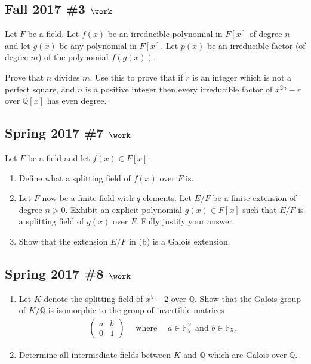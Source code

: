 \hypertarget{fall-2017-3-work}{%
\subsection{\texorpdfstring{Fall 2017 \#3
\(\work\)}{Fall 2017 \#3 \textbackslash work}}\label{fall-2017-3-work}}

Let \(F\) be a field. Let \(f(x)\) be an irreducible polynomial in
\(F[x]\) of degree \(n\) and let \(g(x)\) be any polynomial in \(F[x]\).
Let \(p(x)\) be an irreducible factor (of degree \(m\)) of the
polynomial \(f(g(x))\).

Prove that \(n\) divides \(m\). Use this to prove that if \(r\) is an
integer which is not a perfect square, and \(n\) is a positive integer
then every irreducible factor of \(x^{2n} - r\) over \({\mathbb{Q}}[x]\)
has even degree.

\hypertarget{spring-2017-7-work}{%
\subsection{\texorpdfstring{Spring 2017 \#7
\(\work\)}{Spring 2017 \#7 \textbackslash work}}\label{spring-2017-7-work}}

Let \(F\) be a field and let \(f(x) \in F[x]\).

\begin{enumerate}
\def\labelenumi{\alph{enumi}.}
\item
  Define what a splitting field of \(f(x)\) over \(F\) is.
\item
  Let \(F\) now be a finite field with \(q\) elements. Let \(E/F\) be a
  finite extension of degree \(n>0\). Exhibit an explicit polynomial
  \(g(x) \in F[x]\) such that \(E/F\) is a splitting field of \(g(x)\)
  over \(F\). Fully justify your answer.
\item
  Show that the extension \(E/F\) in (b) is a Galois extension.
\end{enumerate}

\hypertarget{spring-2017-8-work}{%
\subsection{\texorpdfstring{Spring 2017 \#8
\(\work\)}{Spring 2017 \#8 \textbackslash work}}\label{spring-2017-8-work}}

\begin{enumerate}
\def\labelenumi{\alph{enumi}.}
\item
  Let \(K\) denote the splitting field of \(x^5 - 2\) over
  \({\mathbb{Q}}\). Show that the Galois group of \(K/{\mathbb{Q}}\) is
  isomorphic to the group of invertible matrices
  \begin{align*}
  \left(\begin{array}{ll}
  a & b \\
  0 & 1
  \end{array}\right) 
  {\quad \operatorname{where} \quad} a\in {\mathbb{F}}_5^{\times}\text{ and } b\in {\mathbb{F}}_5
  .\end{align*}
\item
  Determine all intermediate fields between \(K\) and \({\mathbb{Q}}\)
  which are Galois over \({\mathbb{Q}}\).
\end{enumerate}


